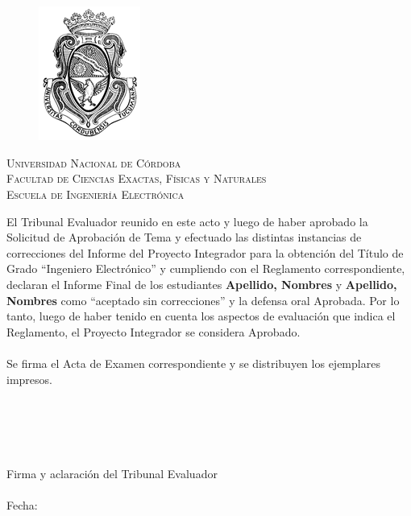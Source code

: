 \documentclass[12pt,A4paper,titlepage, twoside, openright]{report}
\begin{document}
\cleardoublepage

\large


\cleardoublepage

\chapter*{}
\begin{center}
	
	\begin{figure}[h]
		\begin{center}
			\includegraphics[scale=0.8]{logo_unc.png}
		\end{center}
	\end{figure}
	\vspace{0.25em}
	
	\textsc{\LARGE Universidad Nacional de Córdoba}\\[0.3cm] %
	\textsc{\large Facultad de Ciencias Exactas, Físicas y Naturales}\\[0.3cm] %
	\textsc{\large Escuela de Ingeniería Electrónica}\\[0.75cm] %
\end{center}

El Tribunal Evaluador reunido en este acto y luego de haber aprobado la Solicitud de Aprobación de Tema y efectuado las distintas instancias de correcciones del Informe del Proyecto Integrador para la obtención del Título de Grado “Ingeniero Electrónico” y cumpliendo con el Reglamento correspondiente, declaran el Informe Final de los estudiantes \textbf{Apellido, Nombres} y \textbf{Apellido, Nombres} como “aceptado sin correcciones” y la defensa oral Aprobada. Por lo tanto, luego de haber tenido en cuenta los aspectos de evaluación que indica el Reglamento, el Proyecto Integrador se considera Aprobado.
\\
\\
Se firma el Acta de Examen correspondiente y se distribuyen los ejemplares impresos.
\\
\\
\\
\\
\\
\\
Firma y aclaración del Tribunal Evaluador
\\
\\
Fecha:
\end{document}
